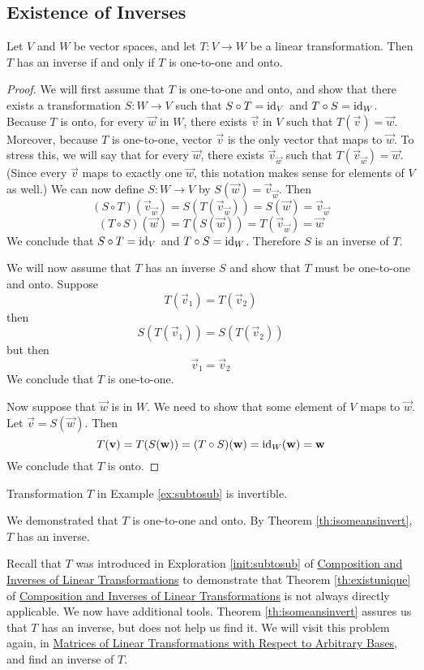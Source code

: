 \documentclass{ximera}
\begin{document}
\subsection*{Existence of Inverses}
\begin{theorem}\label{th:isomeansinvert} Let $V$ and $W$ be vector spaces, and let $T:V\rightarrow W$ be a linear transformation.  Then $T$ has an inverse if and only if $T$ is one-to-one and onto. 
\end{theorem}
\begin{proof}
We will first assume that $T$ is one-to-one and onto, and show that there exists a transformation $S:W\rightarrow V$ such that $S\circ T=\text{id}_V$ and $T\circ S=\text{id}_W$.  Because $T$ is onto, for every $\vec{w}$ in $W$, there exists $\vec{v}$ in $V$ such that $T(\vec{v})=\vec{w}$.  Moreover, because $T$ is one-to-one, vector $\vec{v}$ is the only vector that maps to $\vec{w}$.  To stress this, we will say that for every $\vec{w}$, there exists $\vec{v}_{\vec{w}}$ such that $T(\vec{v}_{\vec{w}})=\vec{w}$. (Since every $\vec{v}$ maps to exactly one $\vec{w}$, this notation makes sense for elements of $V$ as well.)  We can now define $S:W\rightarrow V$ by $S(\vec{w})=\vec{v}_{\vec{w}}$.
Then
$$(S\circ T)(\vec{v}_{\vec{w}})=S(T(\vec{v}_{\vec{w}}))=S(\vec{w})=\vec{v}_{\vec{w}}$$
$$(T\circ S)(\vec{w})=T(S(\vec{w}))=T(\vec{v}_{\vec{w}})=\vec{w}$$
We conclude that $S\circ T=\text{id}_V$ and $T\circ S=\text{id}_W$.  Therefore $S$ is an inverse of $T$.

We will now assume that $T$ has an inverse $S$ and show that $T$ must be one-to-one and onto.  
Suppose $$T(\vec{v}_1)=T(\vec{v}_2)$$ then $$S(T(\vec{v}_1))=S(T(\vec{v}_2))$$
but then
$$\vec{v}_1=\vec{v}_2$$
We conclude that $T$ is one-to-one.

Now suppose that $\vec{w}$ is in $W$.  We need to show that some element of $V$ maps to $\vec{w}$.  Let $\vec{v}=S(\vec{w})$.  Then
$$T(\mathbf{v})=T(S(\mathbf{w}))=(T\circ S)(\mathbf{w})=\text{id}_W(\mathbf{w})=\mathbf{w}$$
We conclude that $T$ is onto.
\end{proof}

\begin{example}\label{ex:subtosubinvert}
Transformation $T$ in Example \ref{ex:subtosub}  is invertible.
\begin{explanation}
We demonstrated that $T$ is one-to-one and onto.  By Theorem \ref{th:isomeansinvert}, $T$ has an inverse.  

Recall that $T$ was introduced in Exploration \ref {init:subtosub} of \href{\xmbaseurl/LTR-0030/main}{Composition and Inverses of Linear Transformations} to demonstrate that Theorem \ref{th:existunique} of \href{\xmbaseurl/LTR-0030/main}{Composition and Inverses of Linear Transformations} is not always directly applicable.  We now have additional tools. Theorem \ref{th:isomeansinvert} assures us that $T$ has an inverse, but does not help us find it. We will visit this problem again, in \href{\xmbaseurl/LTR-0080/main}{Matrices of Linear Transformations with Respect to Arbitrary Bases}, and find an inverse of $T$.
\end{explanation}
\end{example}
\end{document}
